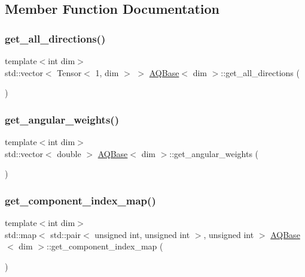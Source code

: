 \subsection{Member Function Documentation}
\mbox{\label{class_a_q_base_ac2e0120510426f0b1dded2d5b546038b}} 
\subsubsection{\texorpdfstring{get\+\_\+all\+\_\+directions()}{get\_all\_directions()}}
{\footnotesize\ttfamily template$<$int dim$>$ \\
std\+::vector$<$ Tensor$<$ 1, dim $>$ $>$ \hyperlink{class_a_q_base}{A\+Q\+Base}$<$ dim $>$\+::get\+\_\+all\+\_\+directions (\begin{DoxyParamCaption}{ }\end{DoxyParamCaption})}

\mbox{\label{class_a_q_base_ac3db7e901486ff088e4eac2f1401f3b6}} 
\subsubsection{\texorpdfstring{get\+\_\+angular\+\_\+weights()}{get\_angular\_weights()}}
{\footnotesize\ttfamily template$<$int dim$>$ \\
std\+::vector$<$ double $>$ \hyperlink{class_a_q_base}{A\+Q\+Base}$<$ dim $>$\+::get\+\_\+angular\+\_\+weights (\begin{DoxyParamCaption}{ }\end{DoxyParamCaption})}

\mbox{\label{class_a_q_base_a016f7ac88052a26c82c8aa3bfba80f73}} 
\subsubsection{\texorpdfstring{get\+\_\+component\+\_\+index\+\_\+map()}{get\_component\_index\_map()}}
{\footnotesize\ttfamily template$<$int dim$>$ \\
std\+::map$<$ std\+::pair$<$ unsigned int, unsigned int $>$, unsigned int $>$ \hyperlink{class_a_q_base}{A\+Q\+Base}$<$ dim $>$\+::get\+\_\+component\+\_\+index\+\_\+map (\begin{DoxyParamCaption}{ }\end{DoxyParamCaption})}


